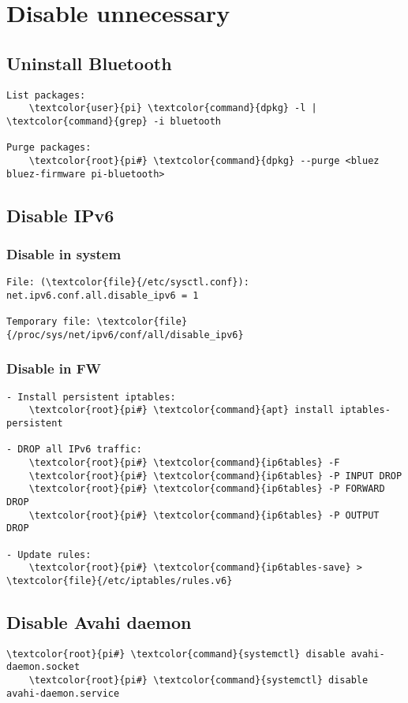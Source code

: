\documentclass[10pt, a4paper, onecolumn, openany]{book} %
\begin{document}
\section{Disable unnecessary}
\subsection{Uninstall Bluetooth}
\begin{Verbatim}[commandchars=\\\{\}]
List packages:
    \textcolor{user}{pi} \textcolor{command}{dpkg} -l | \textcolor{command}{grep} -i bluetooth

Purge packages:
    \textcolor{root}{pi#} \textcolor{command}{dpkg} --purge <bluez bluez-firmware pi-bluetooth>
\end{Verbatim}
\subsection{Disable IPv6}
\subsubsection{Disable in system}
\begin{Verbatim}[commandchars=\\\{\}]
File: (\textcolor{file}{/etc/sysctl.conf}):
net.ipv6.conf.all.disable_ipv6 = 1

Temporary file: \textcolor{file}{/proc/sys/net/ipv6/conf/all/disable_ipv6}
\end{Verbatim}
\subsubsection{Disable in FW}
\begin{Verbatim}[commandchars=\\\{\}]
- Install persistent iptables:
    \textcolor{root}{pi#} \textcolor{command}{apt} install iptables-persistent

- DROP all IPv6 traffic:
    \textcolor{root}{pi#} \textcolor{command}{ip6tables} -F
    \textcolor{root}{pi#} \textcolor{command}{ip6tables} -P INPUT DROP
    \textcolor{root}{pi#} \textcolor{command}{ip6tables} -P FORWARD DROP
    \textcolor{root}{pi#} \textcolor{command}{ip6tables} -P OUTPUT DROP 

- Update rules:
    \textcolor{root}{pi#} \textcolor{command}{ip6tables-save} > \textcolor{file}{/etc/iptables/rules.v6}
\end{Verbatim}


\subsection{Disable Avahi daemon}
\begin{Verbatim}[commandchars=\\\{\}]
    \textcolor{root}{pi#} \textcolor{command}{systemctl} disable avahi-daemon.socket
    \textcolor{root}{pi#} \textcolor{command}{systemctl} disable avahi-daemon.service
\end{Verbatim}
\end{document}
